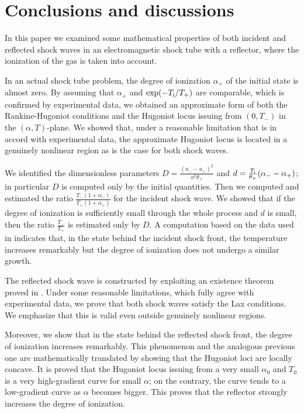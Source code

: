 \documentclass[10pt,a4paper]{article}
\numberwithin{equation}{section}
\newcommand{\Ti}{T_{\rm i}}
\begin{document}
\section{Conclusions and discussions}\label{sec:conclusions}
In this paper we examined some mathematical properties of both incident and reflected shock waves in an electromagnetic shock tube with a reflector, where the ionization of the gas is taken into account. 
\par
In an actual shock tube problem, the degree of ionization $\alpha_+$ of the initial state is almost zero. By assuming that $\alpha_+$ and  $\exp(-\Ti/T_+)$ are comparable, which is confirmed by experimental data, we obtained an approximate form of both the Rankine-Hugoniot conditions and the Hugoniot locus issuing from $(0, T_-)$ in the $(\alpha, T)$-plane. We showed that, under a reasonable limitation that is in accord with experimental data, the approximate Hugoniot locus is located in a genuinely nonlinear region as is the case for both shock waves.
\par
We identified the dimensionless parameters $D=\frac{ (u_- - u_+)^2}{a^2\theta_+}$ and $d=\frac{\Ti}{\theta_+}(\alpha_- - \alpha_+)$; in particular $D$ is computed only by the initial quantities. Then we computed and estimated the ratio $\frac{T_-(1 + \alpha_-)}{T_+(1 + \alpha_+)}$ for the incident shock wave. We showed that if the degree of ionization is sufficiently small through the whole process and $d$ is small, then the ratio $\frac{T_-}{T_+}$ is estimated only by $D.$ A computation based on the data used in \cite{Fukuda-Okasaka-Fujimoto} indicates that, in the state behind the incident shock front, the temperature increases remarkably but the degree of ionization does not undergo a similar growth.
\par
The reflected shock wave is constructed by exploiting an existence theorem proved in \cite{Asakura-Corli_ionized}. Under some reasonable limitations, which fully agree with experimental data, we prove that both shock waves satisfy the Lax conditions. We emphasize that this is valid even outside genuinely nonlinear regions.
\par
Moreover, we show that in the state behind the reflected shock front, the degree of ionization increases remarkably. This phenomenon and the analogous previous one are mathematically translated by showing that the Hugoniot loci are locally concave. It is proved that the Hugoniot locus issuing from a very small $\alpha_0$ and $T_0$ is a very high-gradient curve for small $\alpha$; on the contrary, the curve tends to a low-gradient curve as $\alpha$ becomes bigger. This proves that the reflector strongly increases the degree of ionization.
\end{document}
